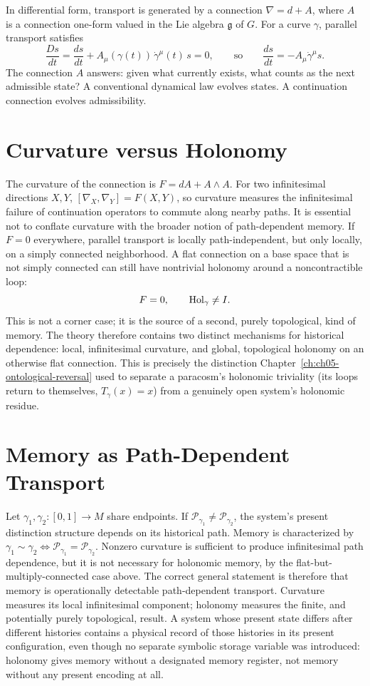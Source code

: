 In differential form, transport is generated by a connection $\nabla = d + A$, where $A$ is a connection one-form valued in the Lie algebra $\mathfrak{g}$ of $G$. For a curve $\gamma$, parallel transport satisfies
\[
\frac{Ds}{dt} = \frac{ds}{dt} + A_\mu(\gamma(t))\,\dot\gamma^\mu(t)\, s = 0, \qquad \text{so} \qquad \frac{ds}{dt} = -A_\mu \dot\gamma^\mu s.
\]
The connection $A$ answers: given what currently exists, what counts as the next admissible state? A conventional dynamical law evolves states. A continuation connection evolves admissibility.

\section{Curvature versus Holonomy}

The curvature of the connection is $F = dA + A \wedge A$. For two infinitesimal directions $X,Y$, $[\nabla_X, \nabla_Y] = F(X,Y)$, so curvature measures the infinitesimal failure of continuation operators to commute along nearby paths. It is essential not to conflate curvature with the broader notion of path-dependent memory. If $F=0$ everywhere, parallel transport is locally path-independent, but only locally, on a simply connected neighborhood. A flat connection on a base space that is not simply connected can still have nontrivial holonomy around a noncontractible loop:
\[
F = 0, \qquad \operatorname{Hol}_\gamma \neq I.
\]
This is not a corner case; it is the source of a second, purely topological, kind of memory. The theory therefore contains two distinct mechanisms for historical dependence: local, infinitesimal curvature, and global, topological holonomy on an otherwise flat connection. This is precisely the distinction Chapter~\ref{ch:ch05-ontological-reversal} used to separate a paracosm's holonomic triviality (its loops return to themselves, $T_\gamma(x) = x$) from a genuinely open system's holonomic residue.

\section{Memory as Path-Dependent Transport}

Let $\gamma_1, \gamma_2 : [0,1] \to M$ share endpoints. If $\mathcal{P}_{\gamma_1} \neq \mathcal{P}_{\gamma_2}$, the system's present distinction structure depends on its historical path. Memory is characterized by $\gamma_1 \sim \gamma_2 \iff \mathcal{P}_{\gamma_1} = \mathcal{P}_{\gamma_2}$. Nonzero curvature is sufficient to produce infinitesimal path dependence, but it is not necessary for holonomic memory, by the flat-but-multiply-connected case above. The correct general statement is therefore that memory is operationally detectable path-dependent transport. Curvature measures its local infinitesimal component; holonomy measures the finite, and potentially purely topological, result. A system whose present state differs after different histories contains a physical record of those histories in its present configuration, even though no separate symbolic storage variable was introduced: holonomy gives memory without a designated memory register, not memory without any present encoding at all.

